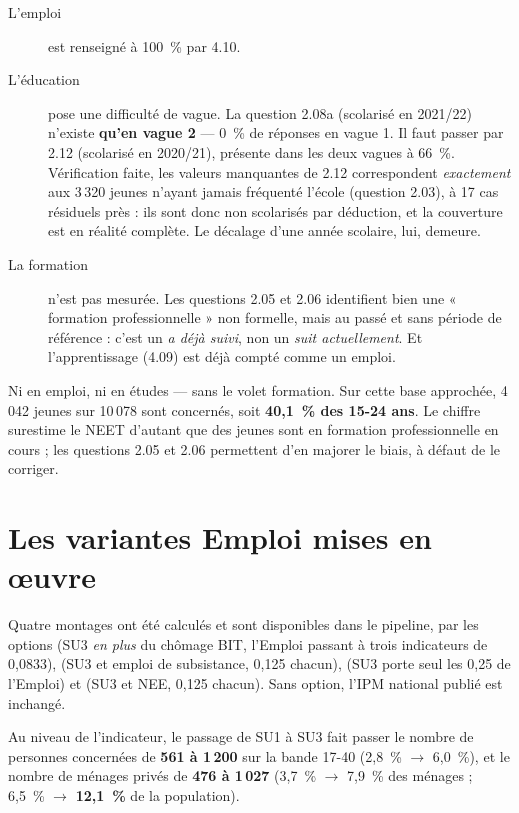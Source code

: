 \documentclass[11pt,a4paper]{article}
\begin{document}
\begin{description}
  \item[L'emploi] est renseigné à 100~\% par 4.10.
  \item[L'éducation] pose une difficulté de vague. La question 2.08a (scolarisé en 2021/22)
  n'existe \textbf{qu'en vague 2} --- 0~\% de réponses en vague 1. Il faut passer par 2.12
  (scolarisé en 2020/21), présente dans les deux vagues à 66~\%. Vérification faite, les valeurs
  manquantes de 2.12 correspondent \emph{exactement} aux 3\,320 jeunes n'ayant jamais fréquenté
  l'école (question 2.03), à 17 cas résiduels près : ils sont donc non scolarisés par déduction,
  et la couverture est en réalité complète. Le décalage d'une année scolaire, lui, demeure.
  \item[La formation] n'est pas mesurée. Les questions 2.05 et 2.06 identifient bien une
  « formation professionnelle » non formelle, mais au passé et sans période de référence : c'est
  un \emph{a déjà suivi}, non un \emph{suit actuellement}. Et l'apprentissage (4.09) est déjà
  compté comme un emploi.
\end{description}

\begin{attention}
Ni en emploi, ni en études --- sans le volet formation. Sur cette base approchée, 4\,042 jeunes
sur 10\,078 sont concernés, soit \textbf{40,1~\% des 15-24 ans}. Le chiffre surestime le NEET
d'autant que des jeunes sont en formation professionnelle en cours ; les questions 2.05 et 2.06
permettent d'en majorer le biais, à défaut de le corriger.
\end{attention}

\section{Les variantes Emploi mises en \oe uvre}

Quatre montages ont été calculés et sont disponibles dans le pipeline, par les options
 (SU3 \emph{en plus} du chômage BIT, l'Emploi passant à trois indicateurs de
0,0833),  (SU3 et emploi de subsistance, 0,125 chacun),
 (SU3 porte seul les 0,25 de l'Emploi) et  (SU3 et NEE,
0,125 chacun). Sans option, l'IPM national publié est inchangé.

Au niveau de l'indicateur, le passage de SU1 à SU3 fait passer le nombre de personnes concernées
de \textbf{561 à 1\,200} sur la bande 17-40 (2,8~\% $\rightarrow$ 6,0~\%), et le nombre de ménages
privés de \textbf{476 à 1\,027} (3,7~\% $\rightarrow$ 7,9~\% des ménages ; 6,5~\%
$\rightarrow$ \textbf{12,1~\%} de la population).
\end{document}
